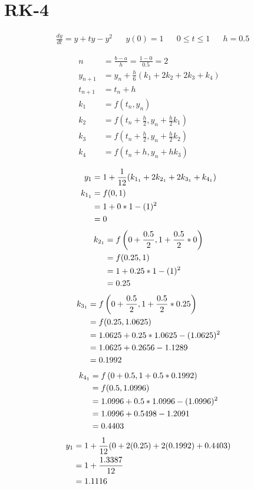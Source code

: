 \section{RK-4}
	\begin{align}
		&\frac{dy}{dt} = y + ty - y^{2}&
		&y(0) = 1&
		&0 \leq t \leq 1&
		&h = 0.5&
	\end{align}

	\begin{align}
		n &= \frac{b-a}{h} = \frac{1 - 0}{0.5} = 2& \\
		y_{n+1} &= y_{n} + \frac{h}{6}(k_{1} + 2k_{2} + 2k_{3} + k_{4})& \\
		t_{n+1} &= t_{n} + h& \\
		k_{1} &= f(t_{n}, y_{n})& \\
		k_{2} &= f(t_{n} + \frac{h}{2}, y_{n} + \frac{h}{2}k_{1})& \\
		k_{3} &= f(t_{n} + \frac{h}{2}, y_{n} + \frac{h}{2}k_{2})& \\
		k_{4} &= f(t_{n} + h, y_{n} + hk_{3})&
	\end{align}

	\begin{align}
		y_{1} &= 1 + \frac{1}{12}(k_{1_{1}} + 2k_{2_{1}} + 2k_{3_{1}} + k_{4_{1}})& \\
		k_{1_{1}} &= f(0,1)& \notag \\
		&= 1 + 0*1 - (1)^{2}& \notag \\
		&= 0&
	\end{align}
	\begin{align}
		k_{2_{1}} &= f
			\left(
				0 + \frac{0.5}{2}, 1 + \frac{0.5}{2}*0
			\right)
			& \notag \\
		&= f(0.25, 1)& \notag \\
		&= 1 + 0.25*1 - (1)^{2}& \notag \\
		&= 0.25&
	\end{align}
	\begin{align}
		k_{3_{1}} &= f
			\left(
				0 + \frac{0.5}{2}, 1 + \frac{0.5}{2}*0.25
			\right)
			& \notag \\
		&= f(0.25, 1.0625)& \notag \\
		&= 1.0625 + 0.25*1.0625 - (1.0625)^{2}& \notag \\
		&= 1.0625 + 0.2656 - 1.1289& \notag \\
		&= 0.1992&
	\end{align}
	\begin{align}
		k_{4_{1}} &= f
			\left(
				0 + 0.5, 1 + 0.5*0.1992
			\right)
			& \notag \\
		&= f(0.5, 1.0996)& \notag \\
		&= 1.0996 + 0.5*1.0996 - (1.0996)^{2}& \notag \\
		&= 1.0996 + 0.5498 - 1.2091& \notag \\
		&= 0.4403&
	\end{align}
	\begin{align}
		y_{1} &= 1 + \frac{1}{12}(0 + 2(0.25) + 2(0.1992) + 0.4403)& \notag \\
		&= 1 + \frac{1.3387}{12}& \notag \\
		&= 1.1116&
	\end{align}

